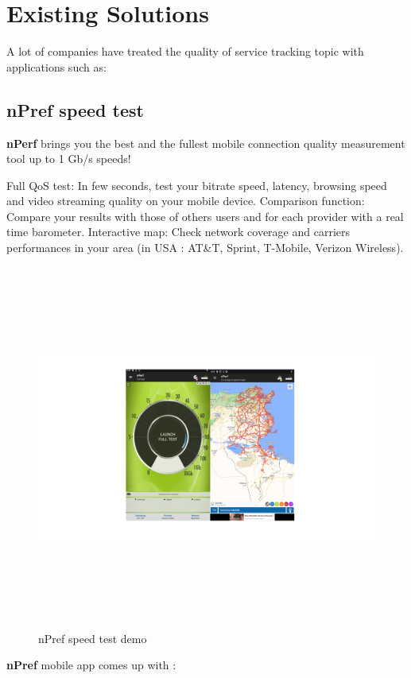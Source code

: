 \section{Existing  Solutions}
A lot of companies have treated the quality of service tracking topic with applications such as:


\subsection{nPref speed test}
\textbf{nPerf}   brings you the best and the fullest mobile connection quality measurement tool up to 1 Gb/s speeds!

Full QoS test: In few seconds, test your bitrate speed, latency, browsing speed and video streaming quality on your mobile device.
Comparison function: Compare your results with those of others users and for each provider with a real time barometer.
Interactive map: Check network coverage and carriers performances in your area (in USA : AT\&T, Sprint, T-Mobile, Verizon Wireless).\cite{nPerf}
\begin{figure}[H]
    \centering
    \includegraphics[height=12cm]{images/chap1/nPref.png}
    \caption{nPref speed test demo}
    \label{fig:enter-label}
\end{figure}
\textbf{nPref} mobile app comes up with :
